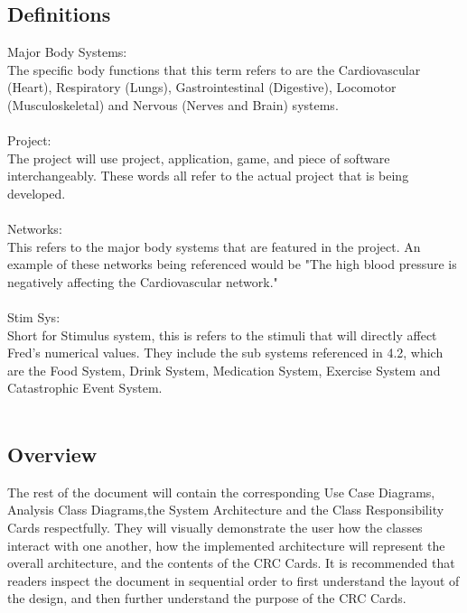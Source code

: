 \documentclass[]{article}
\begin{document}
\subsection{Definitions}
\label{sub:system_description}

Major Body Systems: \\ The specific body functions that this term refers to are the Cardiovascular (Heart), Respiratory (Lungs), Gastrointestinal (Digestive), Locomotor (Musculoskeletal) and Nervous (Nerves and Brain) systems.\\\\
Project: \\The project will use project, application, game, and piece of software interchangeably. These words all refer to the actual project that is being developed. \\\\
Networks: \\This refers to the major body systems that are featured in the project. An example of these networks being referenced would be "The high blood pressure is negatively affecting the Cardiovascular network."\\\\
Stim Sys: \\ Short for Stimulus system, this is refers to the stimuli that will directly affect Fred's numerical values. They include the sub systems referenced in 4.2, which are the Food System, Drink System, Medication System, Exercise System and Catastrophic Event System.\\\\


\subsection{Overview}
\label{sub:overview}
	The rest of the document will contain the corresponding Use Case Diagrams, Analysis Class Diagrams,the System Architecture and the Class Responsibility Cards respectfully. They will visually demonstrate the user how the classes interact with one another, how the implemented architecture will represent the overall architecture, and the contents of the CRC Cards. It is recommended that readers inspect the document in sequential order to first understand the layout of the design, and then further understand the purpose of the CRC Cards.

\end{document}
